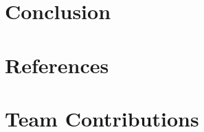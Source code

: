 \documentclass[newfonts=false,format=sigconf,10pt,letterpaper]{acmart}
\begin{document}
\section{Conclusion}
\label{sec:conclusion}


\section{References}
\label{sec:ref}


\section*{Team Contributions}
\label{sec:team}


% 
%
\end{document}
